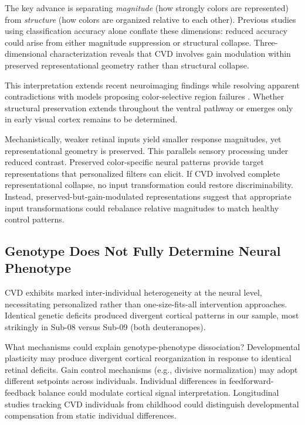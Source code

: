 \documentclass[12pt,a4paper]{article}
\begin{document}
The key advance is separating \emph{magnitude} (how strongly colors are represented) from \emph{structure} (how colors are organized relative to each other). Previous studies using classification accuracy alone conflate these dimensions: reduced accuracy could arise from either magnitude suppression or structural collapse. Three-dimensional characterization reveals that CVD involves gain modulation within preserved representational geometry rather than structural collapse.

This interpretation extends recent neuroimaging findings \parencite{Tregillus2021} while resolving apparent contradictions with models proposing color-selective region failures \parencite{Neitz2011}. Whether structural preservation extends throughout the ventral pathway or emerges only in early visual cortex remains to be determined.

Mechanistically, weaker retinal inputs yield smaller response magnitudes, yet representational geometry is preserved. This parallels sensory processing under reduced contrast. Preserved color-specific neural patterns provide target representations that personalized filters can elicit. If CVD involved complete representational collapse, no input transformation could restore discriminability. Instead, preserved-but-gain-modulated representations suggest that appropriate input transformations could rebalance relative magnitudes to match healthy control patterns.

\subsection{Genotype Does Not Fully Determine Neural Phenotype}

CVD exhibits marked inter-individual heterogeneity at the neural level, necessitating personalized rather than one-size-fits-all intervention approaches. Identical genetic deficits produced divergent cortical patterns in our sample, most strikingly in Sub-08 versus Sub-09 (both deuteranopes).

What mechanisms could explain genotype-phenotype dissociation? Developmental plasticity may produce divergent cortical reorganization in response to identical retinal deficits. Gain control mechanisms (e.g., divisive normalization) may adopt different setpoints across individuals. Individual differences in feedforward-feedback balance could modulate cortical signal interpretation. Longitudinal studies tracking CVD individuals from childhood could distinguish developmental compensation from static individual differences.
\end{document}

